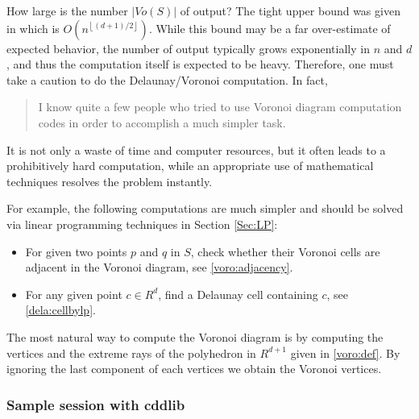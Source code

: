 \documentclass[a4paper,12pt]{article}
\begin{document}
How large is the number $|Vo(S)|$ of output?  The tight upper bound
was given in \cite{s-eubnf-91} which is 
$O(n^{\left\lfloor (d+1)/2 \right\rfloor})$.
While this bound may be a far over-estimate of expected behavior,
the number of output typically grows exponentially 
in $n$ and $d$, and thus the computation itself
is expected to be heavy.  Therefore, one must take a caution to do
the Delaunay/Voronoi computation.  In fact,
\begin{quote} I know quite a few people who tried to
use Voronoi diagram computation codes in order to accomplish
a much simpler task.
\end{quote}
It is not only a waste of time and computer resources, but
it often leads to a prohibitively hard computation, while
an appropriate use of mathematical techniques resolves
the problem instantly.

For example, the following computations are much simpler
and should be solved via linear programming techniques in Section \ref{Sec:LP}:
\begin{itemize}
\item For given two points $p$ and $q$ in $S$, check whether
their Voronoi cells are adjacent in the Voronoi diagram, see \ref{voro:adjacency}.
\item For any given point $c\in R^d$, find a Delaunay cell
containing $c$, see \ref{dela:cellbylp}.

\end{itemize}

The most natural way to compute the Voronoi diagram is by
computing the vertices and the extreme rays
of the polyhedron in $R^{d+1}$ given
in \ref{voro:def}.  By ignoring the last component
of each vertices we obtain the Voronoi vertices.

\subsubsection{Sample session with cddlib} 
\label{voro:computation:session}
\end{document}
